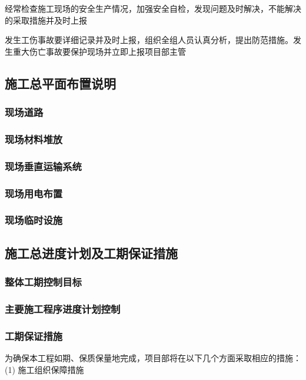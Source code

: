  经常检查施工现场的安全生产情况，加强安全自检，发现问题及时解决，不能解决的采取措施并及时上报

 发生工伤事故要详细记录并及时上报，组织全组人员认真分析，提出防范措施。发生重大伤亡事故要保护现场并立即上报项目部主管\\

\subsection{施工总平面布置说明}
\subsubsection{现场道路}
\subsubsection{现场材料堆放}
\subsubsection{现场垂直运输系统}
\subsubsection{现场用电布置}
\subsubsection{现场临时设施}

\subsection{施工总进度计划及工期保证措施}
\subsubsection{整体工期控制目标}
\subsubsection{主要施工程序进度计划控制}
\subsubsection{工期保证措施}

为确保本工程如期、保质保量地完成，项目部将在以下几个方面采取相应的措施：\\

(1) 施工组织保障措施\\

